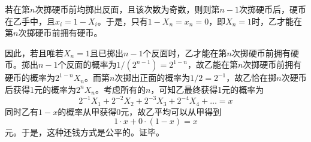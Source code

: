 若在第$n$次掷硬币前均掷出反面，且该次数为奇数，则则第$n - 1$次掷硬币后，硬币在乙手中，且$x_i = 1 - X_i$。于是，只有$1 - X_n = x_n = 0$，即$X_n = 1$时，乙才能在第$n$次掷硬币前拥有硬币。

因此，若且唯若$X_n = 1$且已掷出$n - 1$个反面时，乙才能在第$n$次掷硬币前拥有硬币。掷出$n - 1$个反面的概率为$1/\left(2^{n - 1}\right) = 2^{1 - n}$，故乙能在第$n$次掷硬币前拥有硬币的概率为$2^{1 - n}X_n$。而第$n$次掷出正面的概率为$1/2 = 2^{-1}$，故乙恰在掷$n$次硬币后获得1元的概率为$2^nX_n$。考虑所有的$n$，可知乙最终获得1元的概率为
\[ 2^{-1}X_1 + 2^{-2}X_2 + 2^{-3}X_3 + 2^{-4}X_4 + \dots = x \]
同时乙有$1 - x$的概率从甲获得0元，故乙平均可以从甲得到
\[ 1\cdot x + 0\cdot(1 - x) = x \]
元。于是，这种还钱方式是公平的。证毕。
